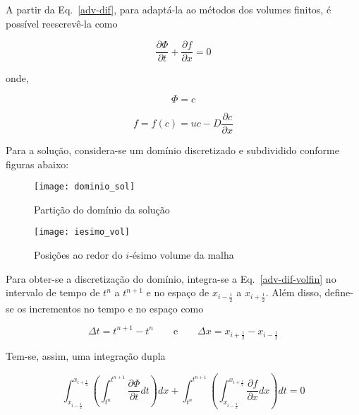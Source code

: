 A partir da Eq.\ \ref{adv-dif}, para adaptá-la ao métodos dos volumes finitos,
é possível reescrevê-la como

\begin{equation}\label{adv-dif-volfin}
    \frac{\partial\Phi}{\partial t} + \frac{\partial f}{\partial x} = 0
\end{equation}

\noindent onde,

\noindent
\begin{minipage}{.4\linewidth}
    \begin{equation}
        \Phi = c
    \end{equation}
\end{minipage}%
\begin{minipage}{.6\linewidth}
    \begin{equation}
        f = f(c) = uc - D\frac{\partial c}{\partial x}
    \end{equation}
\end{minipage}

\bigskip
Para a solução, considera-se um domínio discretizado e subdividido conforme
figuras abaixo:

\begin{figure}[h]
    \centering
    \texttt{[image: dominio\_sol]}
    \caption{Partição do domínio da solução}
\end{figure}

\begin{figure}[h]
    \centering
    \texttt{[image: iesimo\_vol]}
    \caption{Posições ao redor do $i$-ésimo volume da malha}
\end{figure}

\noindent Para obter-se a discretização do domínio, integra-se a Eq.\
\ref{adv-dif-volfin} no intervalo de tempo de $t^n$ a $t^{n+1}$ e no espaço de
$x_{i-\frac{1}{2}}$ a $x_{i+\frac{1}{2}}$. Além disso, define-se os incrementos
no tempo e no espaço como

\[
    \Delta t = t^{n+1} - t^n \qquad\text{e}\qquad \Delta x = x_{i+\frac{1}{2}}
    - x_{i-\frac{1}{2}}
\]

\noindent Tem-se, assim, uma integração dupla

\[
    \int_{x_{i-\frac{1}{2}}}^{x_{i+\frac{1}{2}}} \left( \int_{t^n}^{t^{n+1}}
    \frac{\partial \Phi}{\partial t}dt \right)dx
    +
    \int_{t^n}^{t^{n+1}} \left(\int_{x_{i-\frac{1}{2}}}^{x_{i+\frac{1}{2}}}
    \frac{\partial f}{\partial x}dx \right)dt
    = 0
\]

